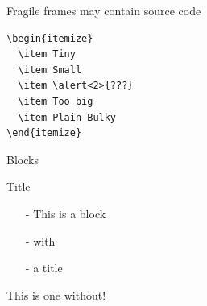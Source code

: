\documentclass[aspectratio=169]{beamer}
\begin{document}
\begin{frame}[fragile]{Fragile frames may contain source code}
\begin{verbatim}
\begin{itemize}
  \item Tiny
  \item Small
  \item \alert<2>{???}
  \item Too big
  \item Plain Bulky
\end{itemize}
\end{verbatim}
\end{frame}

\begin{frame}{Blocks}
    \begin{block}{Title}
        \begin{itemize}
            \item[-] This is a block
            \item[-] with
            \item[-] a title
        \end{itemize}
    \end{block}
    
    \begin{block}{}
        This is one without!
    \end{block}
    
\end{frame}
\end{document}
